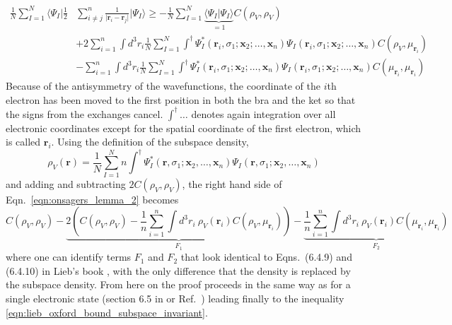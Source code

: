 \documentclass[journal=jpca,manuscript=article,layout=singlecolumn]{achemso}
\renewcommand\vec[1]{\mathbf{#1}}
\begin{document}
\begin{equation}
\begin{split}
\frac{1}{N} \sum_{I=1}^N \langle \Psi_I \vert \frac{1}{2} & \sum_{i \neq j}^n \frac{1}{\vert \vec{r}_i - \vec{r}_j \vert} \vert \Psi_I \rangle
\geq
-\frac{1}{N} \sum_{I=1}^{N} \underbrace{\langle \Psi_I \vert \Psi_I \rangle}_{=1} C(\rho_V, \rho_V) \\
& + 2 \sum_{i=1}^n \int d^3r_i 
\frac{1}{N} \sum_{I=1}^{N} \int^{\dagger} \Psi_I^*(\vec{r}_i,\sigma_1;\vec{x}_2;\ldots,\vec{x}_n)
\Psi_I(\vec{r}_i,\sigma_1;\vec{x}_2;\ldots,\vec{x}_n)
C(\rho_V,\mu_{\vec{r}_i})
\\
& - \sum_{i=1}^n \int d^3r_i
\frac{1}{N} \sum_{I=1}^{N} \int^{\dagger} \Psi_I^*(\vec{r}_i,\sigma_1;\vec{x}_2;\ldots,\vec{x}_n)
\Psi_I(\vec{r}_i,\sigma_1;\vec{x}_2;\ldots,\vec{x}_n)
C(\mu_{\vec{r}_i},\mu_{\vec{r}_i}) \label{eqn:onsagers_lemma_2}
\end{split}
\end{equation}
Because of the antisymmetry of the wavefunctions, the coordinate of the $i$th electron has been moved to the first position in both the bra
and the ket so that the signs from the exchanges cancel. $\int^{\dagger}\ldots$ denotes again integration over all electronic coordinates except
for the spatial coordinate of the first electron, which is called $\vec{r}_i$. 
Using the definition of the subspace density,
\begin{equation}
 \rho_V(\vec{r}) = \frac{1}{N} \sum_{I=1}^{N} n \int^{\dagger}
 \Psi_I^*(\vec{r},\sigma_1;\vec{x}_2,\ldots,\vec{x}_n) \Psi_I(\vec{r},\sigma_1;\vec{x}_2,\ldots,\vec{x}_n)
\end{equation}
and adding and subtracting $2 C(\rho_V,\rho_V)$, the right hand side of Eqn.~\ref{eqn:onsagers_lemma_2}
becomes
\begin{equation}
 C(\rho_V,\rho_V) 
  - \underbrace{2 \left( 
    C(\rho_V,\rho_V) - \frac{1}{n} \sum_{i=1}^{n} \int d^3r_i ~ \rho_V(\vec{r}_i) C(\rho_V,\mu_{\vec{r}_i})
    \right)}_{F_1}
  - \underbrace{\frac{1}{n} \sum_{i=1}^{n} \int d^3r_i ~ \rho_V(\vec{r}_i) C(\mu_{\vec{r}_i},\mu_{\vec{r}_i})}_{F_2}
\end{equation}
where one can identify terms $F_1$ and $F_2$ that look identical to
Eqns.~(6.4.9) and (6.4.10) in Lieb's book \cite{Lieb2010_Stability_of_Matter},
with the only difference that the density is replaced by the subspace density.
From here on the proof proceeds in the same way as for a single electronic state (section 6.5 in \cite{Lieb2010_Stability_of_Matter}
or Ref.~\cite{Lieb1981}) leading finally to the inequality \ref{eqn:lieb_oxford_bound_subspace_invariant}.



\end{document}
